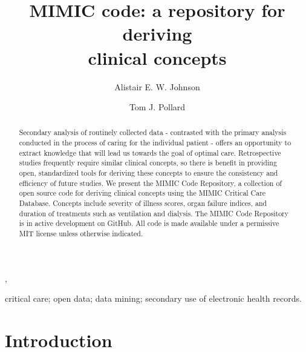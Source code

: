 \documentclass{elsart}
\begin{document}
\begin{frontmatter}
\title{MIMIC code: a repository for deriving\\ clinical concepts}

\author[Cambridge]{Alistair E. W. Johnson},
\author[Cambridge]{Tom J. Pollard}
\address[Cambridge]{Massachusetts institute of Technology, Cambridge}

          
\begin{keyword}
critical care; open data; data mining; secondary use of electronic health records.
\end{keyword}


\begin{abstract}
Secondary analysis of routinely collected data - contrasted with the primary analysis conducted in the process of caring for the individual patient - offers an opportunity to extract knowledge that will lead us towards the goal of optimal care. Retrospective studies frequently require similar clinical concepts, so there is benefit in providing open, standardized tools for deriving these concepts to ensure the consistency and efficiency of future studies. We present the MIMIC Code Repository, a collection of open source code for deriving clinical concepts using the MIMIC Critical Care Database. Concepts include severity of illness scores, organ failure indices, and duration of treatments such as ventilation and dialysis. The MIMIC Code Repository is in active development on GitHub. All code is made available under a permissive MIT license unless otherwise indicated.\\
\end{abstract}

\end{frontmatter}


\section{Introduction}

\end{document}
